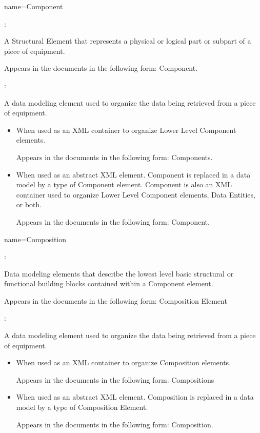 {
  name={Component}
}
{
  :

  A Structural Element that represents a physical or logical part or subpart of a piece of equipment.

  Appears in the documents in the following form: Component.

  :

  A data modeling element used to organize the data being retrieved from a piece of equipment.
  \begin{itemize}
      \item When used as an XML container to organize Lower Level Component elements. 
      
      Appears in the documents in the following form: Components.
      \item When used as an abstract XML element. Component is replaced in a data model by a type of Component element. Component is also an XML container used to organize Lower Level Component elements, Data Entities, or both.
      
      Appears in the documents in the following form: Component.
  \end{itemize}
}

{
  name={Composition}
}
{
  :

  Data modeling elements that describe the lowest level basic structural or functional building blocks contained within a Component element.

  Appears in the documents in the following form: Composition Element

  :

  A data modeling element used to organize the data being retrieved from a piece of equipment.
  \begin{itemize}
      \item When used as an XML container to organize Composition elements. 
      
      Appears in the documents in the following form: Compositions
      \item When used as an abstract XML element. Composition is replaced in a data model by a type of Composition Element. 
      
      Appears in the documents in the following form: Composition.
  \end{itemize}
}


